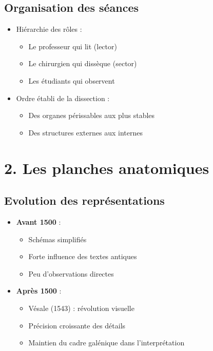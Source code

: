 \documentclass[
  letterpaper,
  DIV=11,
  numbers=noendperiod]{scrreprt}
\providecommand{\tightlist}{%
  \setlength{\itemsep}{0pt}\setlength{\parskip}{0pt}}\usepackage{longtable,booktabs,array}
\begin{document}
\subsection{Organisation des séances}\label{organisation-des-suxe9ances}

\begin{itemize}
\tightlist
\item
  Hiérarchie des rôles :

  \begin{itemize}
  \tightlist
  \item
    Le professeur qui lit (lector)
  \item
    Le chirurgien qui dissèque (sector)
  \item
    Les étudiants qui observent
  \end{itemize}
\item
  Ordre établi de la dissection :

  \begin{itemize}
  \tightlist
  \item
    Des organes périssables aux plus stables
  \item
    Des structures externes aux internes
  \end{itemize}
\end{itemize}

\section{2. Les planches anatomiques}\label{les-planches-anatomiques}

\subsection{Evolution des
représentations}\label{evolution-des-repruxe9sentations}

\begin{itemize}
\tightlist
\item
  \textbf{Avant 1500} :

  \begin{itemize}
  \tightlist
  \item
    Schémas simplifiés
  \item
    Forte influence des textes antiques
  \item
    Peu d'observations directes
  \end{itemize}
\item
  \textbf{Après 1500} :

  \begin{itemize}
  \tightlist
  \item
    Vésale (1543) : révolution visuelle
  \item
    Précision croissante des détails
  \item
    Maintien du cadre galénique dans l'interprétation
  \end{itemize}
\end{itemize}
\end{document}
